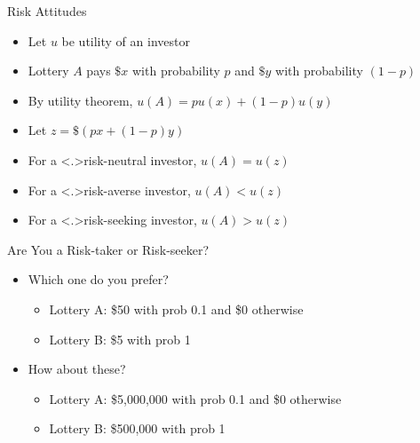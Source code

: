 \documentclass[11pt,aspectratio=169]{beamer}
\begin{document}
  \begin{frame}{Risk Attitudes}
   \begin{itemize}[<+->]
    \item Let $u$ be utility of an investor
    \item Lottery $A$ pays $\$x$ with probability $p$ and $\$y$ with probability $(1-p)$
    \item By utility theorem, $u(A) = pu(x) + (1-p)u(y)$
    \item Let $z  = \$(px + (1-p)y)$
    \item For a \alert<.>{risk-neutral} investor, $u(A) = u(z)$
    \item For a \alert<.>{risk-averse} investor, $u(A) < u(z)$
    \item For a \alert<.>{risk-seeking} investor, $u(A) > u(z)$
   \end{itemize}
  \end{frame}
  
  \begin{frame}{Are You a Risk-taker or Risk-seeker?}
   \begin{itemize}
    \setlength{\itemsep}{2em}
    \item<1-> Which one do you prefer?
    \begin{itemize}
     \item Lottery A: \$50 with prob 0.1 and \$0 otherwise
     \item Lottery B: \$5 with prob 1
    \end{itemize}
    \item<2-> How about these?
    \begin{itemize}
     \item Lottery A: \$5,000,000 with prob 0.1 and \$0 otherwise
     \item Lottery B: \$500,000 with prob 1
    \end{itemize}
   \end{itemize}
  \end{frame}
  
\end{document}
